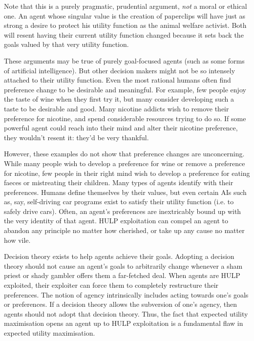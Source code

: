 \documentclass{article}
\begin{document}
Note that this is a purely pragmatic, prudential argument, \textit{not} a moral or ethical one. An agent whose singular value is the creation of paperclips will have just as strong a desire to protect his utility function as the animal welfare activist. Both will resent having their current utility function changed because it sets back the goals valued by that very utility function.

These arguments may be true of purely goal-focused agents (such as some forms of artificial intelligence). But other decision makers might not be so intensely attached to their utility function. Even the most rational humans often find preference change to be desirable and meaningful. For example, few people enjoy the taste of wine when they first try it, but many consider developing such a taste to be desirable and good. Many nicotine addicts wish to remove their preference for nicotine, and spend considerable resources trying to do so. If some powerful agent could reach into their mind and alter their nicotine preference, they wouldn't resent it: they'd be very thankful.

However, these examples do not show that preference changes are unconcerning. While many people wish to develop a preference for wine or remove a preference for nicotine, few people in their right mind wish to develop a preference for eating faeces or mistreating their children. Many types of agents identify with their preferences. Humans define themselves by their values, but even certain AIs such as, say, self-driving car programs exist to satisfy their utility function (i.e. to safely drive cars). Often, an agent's preferences are inextricably bound up with the very identity of that agent. HULP exploitation can compel an agent to abandon any principle no matter how cherished, or take up any cause no matter how vile. 

Decision theory exists to help agents achieve their goals. Adopting a decision theory should not cause an agent's goals to arbitrarily change whenever a sham priest or shady gambler offers them a far-fetched deal. When agents are HULP exploited, their exploiter can force them to completely restructure their preferences. The notion of agency intrinsically includes acting towards one's goals or preferences. If a decision theory allows the subversion of one's agency, then agents should not adopt that decision theory. Thus, the fact that expected utility maximisation opens an agent up to HULP exploitation is a fundamental flaw in expected utility maximisation.
\end{document}
